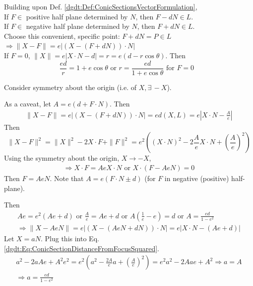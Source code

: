 \begin{theorem}\label{dgdt:Thm:MoreConicSectionsFromVectorFormulation}
	Building upon Def. \ref{dgdt:Def:ConicSectionsVectorFormulation}, \\
	
	If $F \in $ positive half plane determined by $N$, then $F -d N \in L$.  \\
	
	If $F \in $ negative half plane determined by $N$, then $F + dN \in L$. \\
	
Choose this convenient, specific point: $ F + dN = P \in L$ \quad \, $\Longrightarrow \| X - F \| = e |(X - (F + dN))\cdot N |$ \\

If $F = 0$, $\| X \| = e| X\cdot N - d | = r = e(d - r\cos{\theta})$. Then
\begin{equation}\label{dgdt:Eq:ConicSectionEqWithCenterAtFocus}
\frac{ed}{r} = 1 + e \cos{\theta} \text{ or } \boxed{ r = \frac{ed }{ 1 + e\cos{\theta}} } \text{ for $F = 0$ }
\end{equation}	

Consider symmetry about the origin (i.e. of $X, \exists \, -X$). 

As a caveat, let $A = e(d + F\cdot N)$. Then
\[
\begin{gathered}
	\| X - F \| = e | (X - (F + dN )) \cdot N | = e d(X, L) = e | X \cdot N - \frac{A}{e} | 
\end{gathered}
\]
Then
\begin{equation}\label{dgdt:Eq:ConicSectionDistanceFromFocusSquared}
\| X - F \|^2 = \| X \|^2 - 2 X\cdot F + \| F \|^2 = e^2 ((X\cdot N)^2 - 2 \frac{A}{e} X\cdot N + \left( \frac{A}{e}\right)^2 )
\end{equation}
Using the symmetry about the origin, $X \to -X$, \\
\[
\begin{gathered}
	\Longrightarrow X\cdot F = Ae X\cdot N \text{ or } X \cdot (F - Ae N) = 0
\end{gathered}
\]
Then $F = AeN$. Note that $A = e(F\cdot N \pm d)$ (for $F$ in negative (positive) half-plane). 

Then
\[
\begin{gathered}
Ae = e^2 ( Ae + d) \text{ or } \frac{A}{e} = Ae + d \text{ or } A \left( \frac{1}{e} - e \right) = d \text{ or } A = \frac{ed}{1 - e^2 } \\
\Longrightarrow \| X - Ae N \| = e| (X - (AeN + dN)) \cdot N | = e|X\cdot N - (Ae + d) |
\end{gathered}
\]
Let $X = aN$. Plug this into Eq. \ref{dgdt:Eq:ConicSectionDistanceFromFocusSquared}.
\begin{equation}\label{dgdt:Eq:SemiMajorAxis}
\begin{gathered} 
a^2 - 2aA e + A^2 e^2 = e^2 (a^2 - \frac{2A}{e} a + \left( \frac{A}{e} \right)^2 ) = e^2 a^2 - 2Aae + A^2 \Longrightarrow a = A \\
\Longrightarrow a = \frac{ed}{1 - e^2 }
\end{gathered} 
\end{equation}


\end{theorem}
